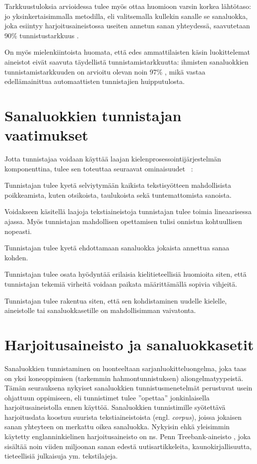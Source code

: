 \documentclass[utf8,bachelor,manualbib]{gradu3}
\begin{document}
Tarkkuustuloksia arvioidessa tulee myös ottaa huomioon varsin korkea lähtötaso: jo yksinkertaisimmalla metodilla, eli valitsemalla kullekin sanalle se sanaluokka, joka esiintyy harjoitusaineistossa useiten annetun sanan yhteydessä, saavutetaan 90\% tunnistustarkkuus \citep{charniak1993}.

On myös mielenkiintoista huomata, että edes ammattilaisten käsin luokittelemat aineistot eivät saavuta täydellistä tunnistamistarkkuutta: ihmisten sanaluokkien tunnistamistarkkuuden on arvioitu olevan noin 97\% \citep{manning2011}, mikä vastaa edellämainittua automaattisten tunnistajien huipputulosta.


\section{Sanaluokkien tunnistajan vaatimukset}

Jotta tunnistajaa voidaan käyttää laajan kielenprosessointijärjestelmän komponenttina, tulee sen toteuttaa seuraavat ominaisuudet ~\citep{cutting1992}: 

\begin{description}[labelindent=1cm]
 \item[Kestävyys] Tunnistajan tulee kyetä selviytymään kaikista tekstisyötteen mahdollisista poikkeamista, kuten otsikoista, taulukoista sekä tuntemattomista sanoista.
 \item[Tehokkuus] Voidakseen käsitellä laajoja tekstiaineistoja tunnistajan tulee toimia lineaarisessa ajassa. Myös tunnistajan mahdollisen opettamisen tulisi onnistua kohtuullisen nopeasti.
 \item[Tarkkuus] Tunnistajan tulee kyetä ehdottamaan sanaluokka jokaista annettua sanaa kohden.
 \item[Viritettävyys] Tunnistajan tulee osata hyödyntää erilaisia kielitieteellisiä huomioita siten, että tunnistajan tekemiä virheitä voidaan paikata määrittämällä sopivia vihjeitä.
 \item[Uudelleenkäytettävyys] Tunnistajan tulee rakentua siten, että sen kohdistaminen uudelle kielelle, aineistolle tai sanaluokkasetille on mahdollisimman vaivatonta.
\end{description}

\section{Harjoitusaineisto ja sanaluokkasetit}

Sanaluokkien tunnistaminen on luonteeltaan sarjanluokitteluongelma, joka taas on yksi koneoppimisen (tarkemmin hahmontunnistuksen) aliongelmatyypeistä. Tämän seurauksena nykyiset sanaluokkien tunnistusmenetelmät perustuvat usein ohjattuun oppimiseen, eli tunnistimet tulee ''opettaa'' jonkinlaisella harjoitusaineistolla ennen käyttöä. Sanaluokkien tunnistimille syötettävä harjoitusdata koostuu suurista tekstiaineistoista (engl. \textit{corpus}), joissa jokaisen sanan yhteyteen on merkattu oikea sanaluokka. Nykyisin ehkä yleisimmin käytetty englanninkielinen harjoitusaineisto on ns. Penn Treebank-aineisto \citep{marcus1993}, joka sisältää noin viiden miljoonan sanan edestä uutisartikkeleita, kaunokirjallisuutta, tieteellisiä julkaisuja ym. tekstilajeja.
\end{document}
